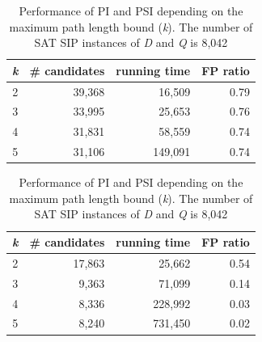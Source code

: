 \documentclass{l4proj}
\begin{document}
\begin{table}
\renewcommand{\arraystretch}{1.2}
\parbox{.45\linewidth}{
\centering
\begin{tabular}{|c|r|r|r|}
\hline
  \emph{k} & \# candidates & running time & FP ratio\\
  \hline
  2 & 39,368 & 16,509 & 0.79 \\
  3 & 33,995 & 25,653 & 0.76 \\
  4 & 31,831 & 58,559 & 0.74 \\
  5 & 31,106 & 149,091 & 0.74 \\
 \hline
\end{tabular}
\caption{PI}\label{table:PI}
}
\parbox{.45\linewidth}{
\centering
\begin{tabular}{ |c|r|r|r|}
\hline
  \emph{k} & \# candidates & running time & FP ratio\\
  \hline
  2 & 17,863 & 25,662 & 0.54 \\
  3 & 9,363  & 71,099 & 0.14 \\
  4 & 8,336  & 228,992 & 0.03 \\
  5 & 8,240  & 731,450 & 0.02 \\
 \hline
\end{tabular}
\caption{PSI}\label{table:PSI}
}
\caption{Performance of PI and PSI depending on the maximum path length bound (\emph{k}). The number of SAT SIP instances of \emph{D} and \emph{Q} is 8,042}
\label{table:PIandPSI}
\end{table}


\end{document}
